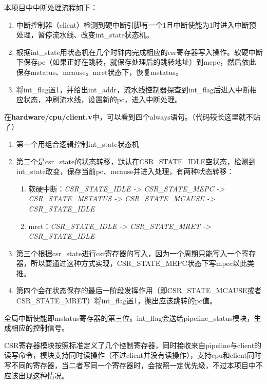 \documentclass[]{article}
\begin{document}
  本项目中中断处理流程如下：
  \begin{enumerate}
      \item 中断控制器（client）检测到硬中断引脚有一个1且中断使能为1时进入中断预处理，暂停流水线、改变int\_state状态机。
      \item 根据int\_state用状态机在几个时钟内完成相应的csr寄存器写入操作。软硬中断下保存pc（如果正好在跳转，就保存处理后的跳转地址）到mepc，然后依此保存mstatus、mcause。mret状态下，恢复mstatus。
      \item 将int\_flag置1，并给出int\_addr，流水线控制器探查到int\_flag后进入中断相应状态，冲刷流水线，设置新的pc，进入中断处理。
  \end{enumerate}
  
  在\textbf{hardware/cpu/client.v}中，可以看到四个always语句。（代码较长这里就不贴了）
  \begin{enumerate}
      \item 第一个用组合逻辑控制int\_state状态机
      \item 第二个是csr\_state的状态转移，默认在CSR\_STATE\_IDLE空状态，检测到int\_state改变，保存当前pc、mcause并进入处理，有两种状态转移：
      \begin{enumerate}
        \item 软硬中断：\textit{CSR\_STATE\_IDLE -> CSR\_STATE\_MEPC -> CSR\_STATE\_MSTATUS -> CSR\_STATE\_MCAUSE -> CSR\_STATE\_IDLE}
        \item mret：\textit{CSR\_STATE\_IDLE -> CSR\_STATE\_MRET -> CSR\_STATE\_IDLE}
      \end{enumerate}
      \item 第三个根据csr\_state进行csr寄存器的写入，因为一个周期只能写入一个寄存器，所以要通过这种方式实现，CSR\_STATE\_MEPC状态下写mpec以此类推。
      \item 第四个会在状态保存的最后一阶段发挥作用（即CSR\_STATE\_MCAUSE或者CSR\_STATE\_MRET）将int\_flag置1，抛出应该跳转的pc值。
  \end{enumerate}
  
  全局中断使能即mstatus寄存器的第三位。int\_flag会送给pipeline\_status模块，生成相应的控制信号。
  
  CSR寄存器模块按照标准定义了几个控制寄存器，同时接收来自pipeline与client的读写命令，模块支持同时读操作（不过client并没有读操作），支持cpu和client同时写不同的寄存器，当二者写同一个寄存器时，会按照一定优先级，不过本项目中不应该出现这种情况。
\end{document}
